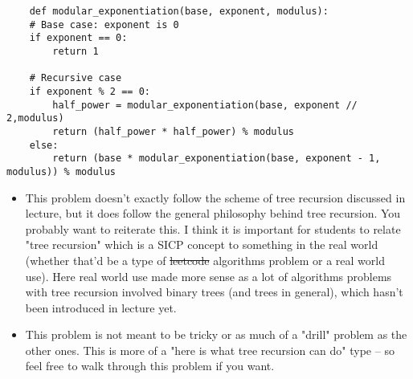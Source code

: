     \begin{blocksection}
    \begin{solution}
    \begin{lstlisting}
    def modular_exponentiation(base, exponent, modulus):
    # Base case: exponent is 0
    if exponent == 0:
        return 1
    
    # Recursive case
    if exponent % 2 == 0:
        half_power = modular_exponentiation(base, exponent // 2,modulus)
        return (half_power * half_power) % modulus
    else:
        return (base * modular_exponentiation(base, exponent - 1, modulus)) % modulus
    \end{lstlisting}
    \end{solution}
    \end{blocksection}
    
    \begin{blocksection}
    \begin{guide}
    \begin{itemize}
      \item This problem doesn't exactly follow the scheme of tree recursion discussed in lecture, but it does follow the general philosophy behind tree recursion. You probably want to reiterate this.
      \subitem I think it is important for students to relate "tree recursion" which is a SICP concept to something in the real world (whether that'd be a type of \st{leetcode} algorithms problem or a real world use). Here real world use made more sense as a lot of algorithms problems with tree recursion involved binary trees (and trees in general), which hasn't been introduced in lecture yet. 
      \item This problem is not meant to be tricky or as much of a "drill" problem as the other ones. This is more of a "here is what tree recursion can do" type -- so feel free to walk through this problem if you want.
    \end{itemize}
    \end{guide}
    \end{blocksection}
    
